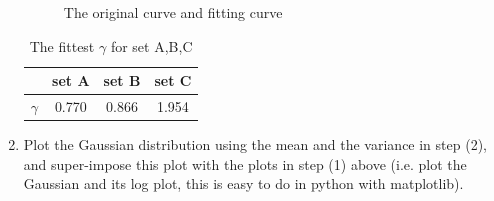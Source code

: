 \documentclass[11pt]{article}
\begin{document}
\begin{enumerate}
\begin{figure}[h]
{    }
    \caption{The original curve and fitting curve}
\end{figure}
\begin{table}[h]
    \centering
    \begin{tabular}{|c|c|c|c|}
        \hline
         & set A & set B & set C \\
        \hline
        $\gamma$ & 0.770 & 0.866 & 1.954 \\
        \hline
    \end{tabular}
    \caption{The fittest $\gamma$ for set A,B,C}
\end{table}

\item Plot the Gaussian distribution using the mean and the variance in step (2), and super-impose this plot with the plots in step (1) above (i.e. plot the Gaussian and its log plot, this is easy to do in python with matplotlib).


\end{enumerate}
\end{document}

